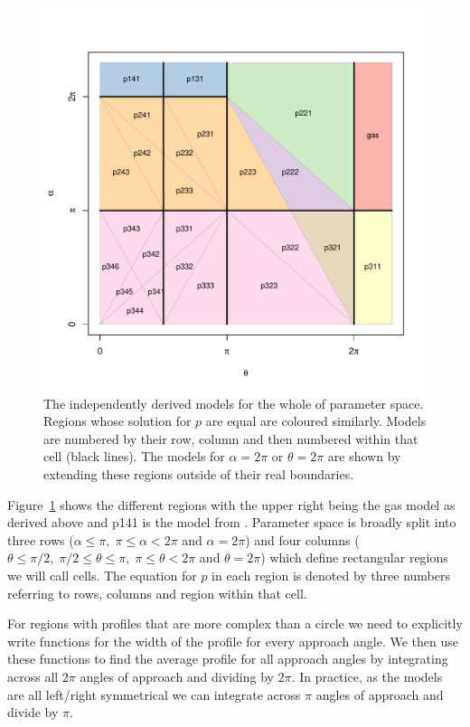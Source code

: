 \documentclass[a4paper,10pt,reqno,oneside]{amsart}
\begin{document}
\begin{figure}
\centering
\includegraphics[width=1\textwidth]{imgs/equalRegions.pdf}
\caption{The independently derived models for the whole of parameter space. Regions whose solution for $p$ are equal are coloured similarly. Models are numbered by their row, column and then numbered within that cell (black lines). The models for $\alpha = 2\pi$ or $\theta =  2\pi$ are shown by extending these regions outside of their real boundaries.}
\label{f:regions}
\end{figure}



Figure~\ref{f:regions} shows the different regions with the upper right being the gas model as derived above and p141 is the model from \cite{rowcliffe2008estimating}. Parameter space is broadly split into three rows ($ \alpha \le \pi,\; \pi \le \alpha < 2\pi$ and $ \alpha = 2\pi$) and four columns ($ \theta \le \pi/2,\;  \pi/2 \le \theta \le  \pi,\;  \pi \le \theta < 2\pi$ and $\theta = 2\pi$) which define rectangular regions we will call cells. The equation for $p$ in each region is denoted by three numbers referring to rows, columns and region within that cell. 

For regions with profiles that are more complex than a circle we need to explicitly write functions for the width of the profile for every approach angle. We then use these functions to find the average profile for all approach angles by integrating across all $2\pi$ angles of approach and dividing by $2\pi$. In practice, as the models are all left/right symmetrical we can integrate across $\pi$ angles of approach and divide by $\pi$.
\end{document}
